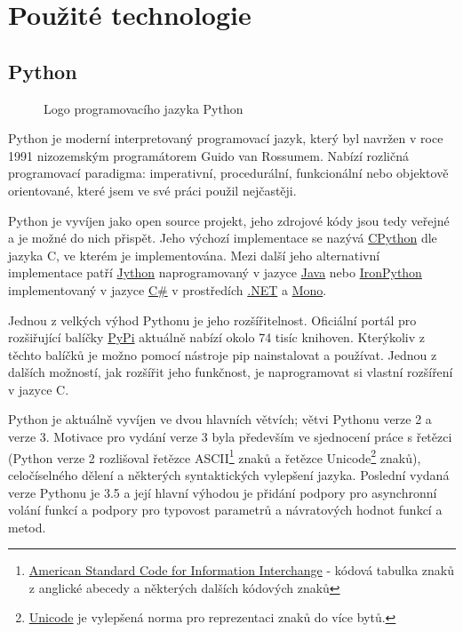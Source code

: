 \section{Použité technologie}

\subsection{Python}

\begin{wrapfigure}{R}{0.5\textwidth}
 \centering
 
 \caption{Logo programovacího jazyka Python}
\end{wrapfigure}

Python je moderní interpretovaný programovací jazyk, který byl navržen v roce 1991 nizozemským programátorem Guido van Rossumem. Nabízí rozličná programovací paradigma: imperativní, procedurální, funkcionální nebo objektově orientované, které jsem ve své práci použil nejčastěji.

Python je vyvíjen jako open source projekt, jeho zdrojové kódy jsou tedy veřejné a je možné do nich přispět. Jeho výchozí implementace se nazývá \href{https://en.wikipedia.org/wiki/CPython}{CPython} dle jazyka C, ve kterém je implementována. Mezi další jeho alternativní implementace patří \href{https://cs.wikipedia.org/wiki/Jython}{Jython} naprogramovaný v jazyce \href{https://cs.wikipedia.org/wiki/Java_%28programovac%C3%AD_jazyk%29}{Java} nebo \href{https://cs.wikipedia.org/wiki/IronPython}{IronPython} implementovaný v jazyce \href{https://cs.wikipedia.org/wiki/C_Sharp}{C\#} v prostředích \href{https://cs.wikipedia.org/wiki/.NET}{.NET} a \href{https://cs.wikipedia.org/wiki/Mono_%28platforma%29}{Mono}.

Jednou z velkých výhod Pythonu je jeho rozšířitelnost. Oficiální portál pro rozšiřující balíčky \href{https://pypi.python.org/pypi}{PyPi} aktuálně nabízí okolo 74 tisíc knihoven. Kterýkoliv z těchto balíčků je možno pomocí nástroje pip nainstalovat a používat. Jednou z dalších možností, jak rozšířit jeho funkčnost, je naprogramovat si vlastní rozšíření v jazyce C.

Python je aktuálně vyvíjen ve dvou hlavních větvích; větvi Pythonu verze 2 a verze 3. Motivace pro vydání verze 3 byla především ve sjednocení práce s řetězci (Python verze 2 rozlišoval řetězce ASCII\footnote{\href{https://cs.wikipedia.org/wiki/ASCII}{American Standard Code for Information Interchange} - kódová tabulka znaků z anglické abecedy a některých dalších kódových znaků} znaků a řetězce Unicode\footnote{\href{https://cs.wikipedia.org/wiki/Unicode}{Unicode} je vylepšená norma pro reprezentaci znaků do více bytů.} znaků), celočíselného dělení a některých syntaktických vylepšení jazyka. Poslední vydaná verze Pythonu je 3.5 a její hlavní výhodou je přidání podpory pro asynchronní volání funkcí a podpory pro typovost parametrů a návratových hodnot funkcí a metod.

